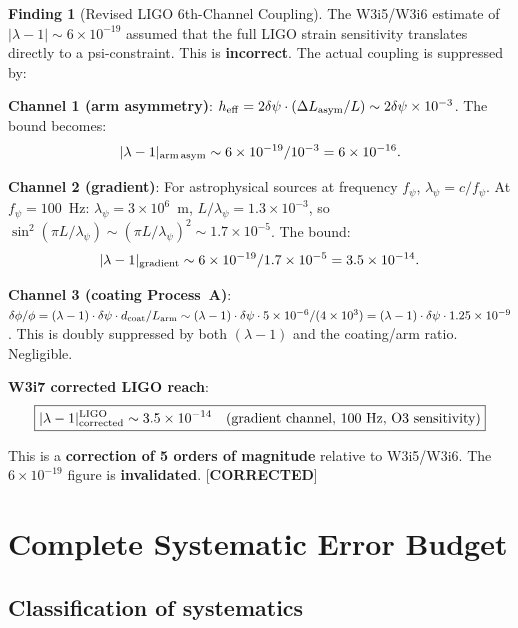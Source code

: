 \documentclass[11pt]{article}
\newcommand{\lam}{\lambda}
\newcommand{\ee}[1]{\times 10^{#1}}
\newcommand{\lbone}{|\lam - 1|}
\theoremstyle{definition}
\newtheorem{finding}[theorem]{Finding}
\theoremstyle{remark}
\begin{document}
\begin{finding}[Revised LIGO 6th-Channel Coupling]
\label{find:ligo_revised}
The W3i5/W3i6 estimate of $\lbone \sim 6\ee{-19}$ assumed that the
full LIGO strain sensitivity translates directly to a psi-constraint.
This is \textbf{incorrect}. The actual coupling is suppressed by:

\textbf{Channel 1 (arm asymmetry)}: $h_{\rm eff} = 2\delta\psi\cdot
(\Delta L_{\rm asym}/L) \sim 2\delta\psi\times 10^{-3}$. The bound
becomes:
\begin{equation}
\lbone_{\rm arm\,asym} \sim 6\ee{-19}/10^{-3} = 6\ee{-16}.
\end{equation}

\textbf{Channel 2 (gradient)}: For astrophysical sources at frequency
$f_\psi$, $\lambda_\psi = c/f_\psi$. At $f_\psi = 100$~Hz:
$\lambda_\psi = 3\ee{6}$~m, $L/\lambda_\psi = 1.3\ee{-3}$, so
$\sin^2(\pi L/\lambda_\psi) \sim (\pi L/\lambda_\psi)^2 \sim 1.7\ee{-5}$.
The bound:
\begin{equation}
\lbone_{\rm gradient} \sim 6\ee{-19}/1.7\ee{-5} = 3.5\ee{-14}.
\end{equation}

\textbf{Channel 3 (coating Process~A)}: $\delta\phi/\phi = (\lam-1)\cdot
\delta\psi\cdot d_{\rm coat}/L_{\rm arm} \sim (\lam-1)\cdot\delta\psi
\cdot 5\ee{-6}/(4\ee{3}) = (\lam-1)\cdot\delta\psi\cdot 1.25\ee{-9}$.
This is doubly suppressed by both $(\lam-1)$ and the coating/arm ratio.
Negligible.

\textbf{W3i7 corrected LIGO reach}:
\begin{equation}
\boxed{
\lbone^{\rm LIGO}_{\rm corrected} \sim 3.5\ee{-14}
\quad\text{(gradient channel, 100~Hz, O3 sensitivity)}
}
\label{eq:ligo_corrected}
\end{equation}

This is a \textbf{correction of 5 orders of magnitude} relative to
W3i5/W3i6. The $6\ee{-19}$ figure is \textbf{invalidated}.
[\textbf{CORRECTED}]
\end{finding}

\section{Complete Systematic Error Budget}
\label{sec:ligo_systematics}

\subsection{Classification of systematics}
\end{document}
